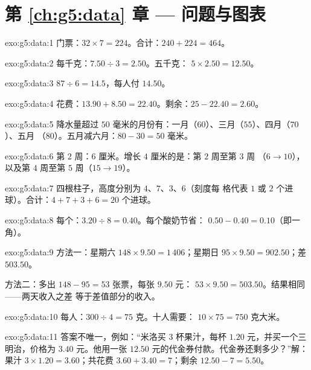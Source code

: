 \section*{第 \ref{ch:g5:data} 章 --- 问题与图表}

\begin{solution}{exo:g5:data:1}
门票：$32 \times 7 = 224$。合计：$240 + 224 = 464$。
\end{solution}

\begin{solution}{exo:g5:data:2}
每千克：$7.50 \div 3 = 2.50$。五千克：
$5 \times 2.50 = 12.50$。
\end{solution}

\begin{solution}{exo:g5:data:3}
$87 \div 6 = 14.5$，每人付 $14.50$。
\end{solution}

\begin{solution}{exo:g5:data:4}
花费：$13.90 + 8.50 = 22.40$。剩余：$25 - 22.40 = 2.60$。
\end{solution}

\begin{solution}{exo:g5:data:5}
降水量超过 $50$ 毫米的月份有：一月（$60$）、三月（$55$）、四月（$70$）、五月
（$80$）。五月减六月：$80 - 30 = 50$ 毫米。
\end{solution}

\begin{solution}{exo:g5:data:6}
第 $2$ 周：$6$ 厘米。增长 $4$ 厘米的是：第 $2$ 周至第 $3$ 周
（$6 \to 10$），以及第 $4$ 周至第 $5$ 周（$15 \to 19$）。
\end{solution}

\begin{solution}{exo:g5:data:7}
四根柱子，高度分别为 $4$、$7$、$3$、$6$（刻度每
格代表 $1$ 或 $2$ 个进球）。合计：$4 + 7 + 3 + 6 = 20$ 个进球。
\end{solution}

\begin{solution}{exo:g5:data:8}
每个：$3.20 \div 8 = 0.40$。每个酸奶节省：
$0.50 - 0.40 = 0.10$（即一角）。
\end{solution}

\begin{solution}{exo:g5:data:9}
方法一：星期六 $148 \times 9.50 = 1\,406$；星期日
$95 \times 9.50 = 902.50$；差 $503.50$。

方法二：多出 $148 - 95 = 53$ 张票，每张 $9.50$ 元：
$53 \times 9.50 = 503.50$。结果相同——两天收入之差
等于差值部分的收入。
\end{solution}

\begin{solution}{exo:g5:data:10}
每人：$300 \div 4 = 75$ 克。十人需要：
$10 \times 75 = 750$ 克大米。
\end{solution}

\begin{solution}{exo:g5:data:11}
答案不唯一，例如：“米洛买 $3$ 杯果汁，每杯
$1.20$ 元，并买一个三明治，价格为 $3.40$ 元。他用一张 $12.50$
元的代金券付款。代金券还剩多少？”解：果汁
$3 \times 1.20 = 3.60$；共花费 $3.60 + 3.40 = 7$；剩余
$12.50 - 7 = 5.50$。
\end{solution}
